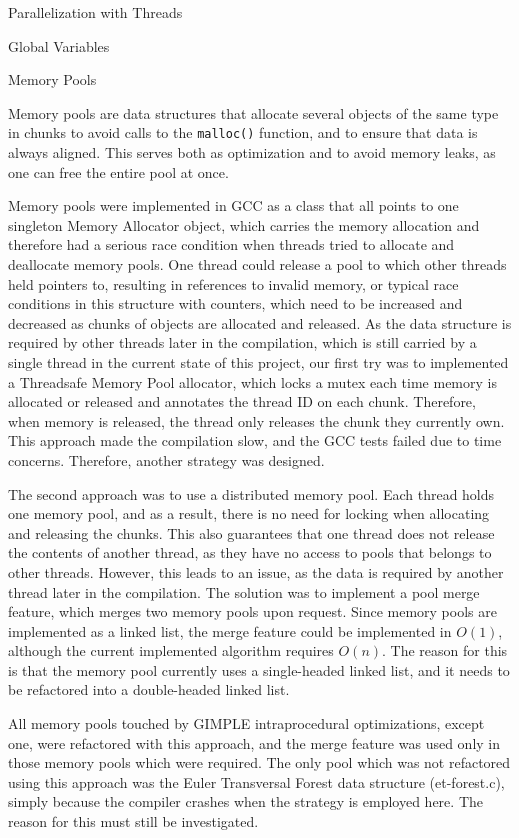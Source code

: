 \begin{section}{Parallelization with Threads}
\begin{subsection}{Global Variables}
\end{subsection}

\begin{subsection}{Memory Pools}

Memory pools are data structures that allocate several objects of the same type
in chunks to avoid calls to the \texttt{malloc()} function, and to ensure that data is
always aligned. This serves both as optimization and to avoid memory leaks, as
one can free the entire pool at once. 

Memory pools were implemented in GCC as a class that all points to one
singleton Memory Allocator object, which carries the memory allocation and
therefore had a serious race condition when threads tried to allocate and
deallocate memory pools. One thread could release a pool to which other threads
held pointers to, resulting in references to invalid memory, or typical race
conditions in this structure with counters, which need to be increased and
decreased as chunks of objects are allocated and released. 
As the data structure is required by other threads later in the compilation,
which is still carried by a single thread in the current state of this project,
our first try was to implemented a Threadsafe Memory Pool allocator, which
locks a mutex each time memory is allocated or released and annotates the
thread ID on each chunk. Therefore, when memory is released, the thread only
releases the chunk they currently own. This approach made the compilation slow,
and the GCC tests failed due to time concerns. Therefore, another strategy was
designed. 

The second approach was to use a distributed memory pool. Each thread holds one
memory pool, and as a result, there is no need for locking when allocating and
releasing the chunks. This also guarantees that one thread does not release the
contents of another thread, as they have no access to pools that belongs to
other threads. However, this leads to an issue, as the data is required by
another thread later in the compilation. The solution was to implement a pool
merge feature, which merges two memory pools upon request. Since memory pools
are implemented as a linked list, the merge feature could be implemented in
$O(1)$, although the current implemented algorithm requires $O(n)$. The reason for
this is that the memory pool currently uses a single-headed linked list, and it
needs to be refactored into a double-headed linked list. 

All memory pools touched by GIMPLE intraprocedural optimizations, except one,
were refactored with this approach, and the merge feature was used only in
those memory pools which were required. The only pool which was not refactored
using this approach was the Euler Transversal Forest data structure
(et-forest.c), simply because the compiler crashes when the strategy is
employed here. The reason for this must still be investigated.


\end{subsection}
\end{section}

